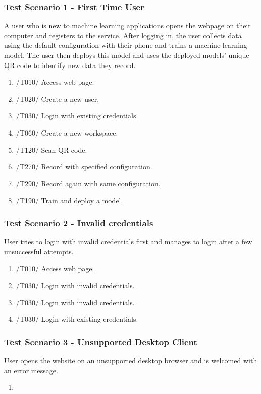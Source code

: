 \subsubsection{Test Scenario 1 - First Time User}
A user who is new to machine learning applications opens the webpage on their computer and registers to the service. After logging in, the user collects data using the default configuration with their phone and trains a machine learning model. The user then deploys this model and uses the deployed models' unique QR code to identify new data they record. 
\newpage
\begin{enumerate}
    \item /T010/ Access web page.
    \item /T020/ Create a new user.
    \item /T030/ Login with existing credentials.
    \item /T060/ Create a new workspace.
    \item /T120/ Scan QR code.
    \item /T270/ Record with specified configuration.
    \item /T290/ Record again with same configuration.
    \item /T190/ Train and deploy a model.
\end{enumerate}
\subsubsection{Test Scenario 2 - Invalid credentials}
User tries to login with invalid credentials first and manages to login after a few unsuccessful attempts.
\begin{enumerate}
    \item /T010/ Access web page.
    \item /T030/ Login with invalid credentials.
    \item /T030/ Login with invalid credentials.
    \item /T030/ Login with existing credentials.
\end{enumerate}
\subsubsection{Test Scenario 3 - Unsupported Desktop Client}
User opens the website on an unsupported desktop browser and is welcomed with an error message.
\begin{enumerate}
    \item 
\end{enumerate} 
